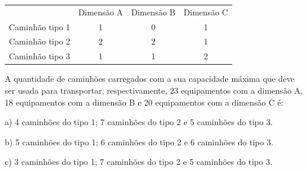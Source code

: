 \documentclass{article}
\begin{document}
\begin{enumerate}
\begin{table}[h]
 \centering
 {\renewcommand\arraystretch{1.25}
 \begin{tabular}{ }

 \end{tabular} }
\end{table}


\begin{table}[h]
 \centering
 {\renewcommand\arraystretch{1.25}
 \begin{tabular}{ l l l l }
  \cline{1-1}\cline{2-2}\cline{3-3}\cline{4-4}  
    \multicolumn{1}{|c|}{  \centering } &
    \multicolumn{1}{c|}{Dimensão A \centering } &
    \multicolumn{1}{c|}{Dimensão B \centering } &
    \multicolumn{1}{c|}{Dimensão C \centering }
  \\  
  \cline{1-1}\cline{2-2}\cline{3-3}\cline{4-4}  
    \multicolumn{1}{|c|}{Caminhão tipo 1 \centering } &
    \multicolumn{1}{c|}{1 \centering } &
    \multicolumn{1}{c|}{0  \centering } &
    \multicolumn{1}{c|}{1 \centering }
  \\  
  \cline{1-1}\cline{2-2}\cline{3-3}\cline{4-4}  
    \multicolumn{1}{|c|}{Caminhão tipo 2 \centering } &
    \multicolumn{1}{c|}{ 2 \centering } &
    \multicolumn{1}{c|}{2 \centering } &
    \multicolumn{1}{c|}{1 \centering }
  \\  
  \cline{1-1}\cline{2-2}\cline{3-3}\cline{4-4}  
    \multicolumn{1}{|c|}{Caminhão tipo 3 \centering } &
    \multicolumn{1}{c|}{1 \centering } &
    \multicolumn{1}{c|}{1 \centering } &
    \multicolumn{1}{c|}{2 \centering }
  \\  
  \hline

 \end{tabular} }
\end{table}\newline

A quantidade de caminhões carregados com a sua capacidade máxima que deve ser usada para
transportar, respectivamente, 23 equipamentos com a dimensão A, 18 equipamentos com a dimensão
B e 20 equipamentos com a dimensão C é:\newline

a) 4 caminhões do tipo 1; 7 caminhões do tipo 2 e 5 caminhões do tipo 3.

b) 5 caminhões do tipo 1; 6 caminhões do tipo 2 e 6 caminhões do tipo 3.

c) 3 caminhões do tipo 1; 7 caminhões do tipo 2 e 5 caminhões do tipo 3.


\end{enumerate}
\end{document}
